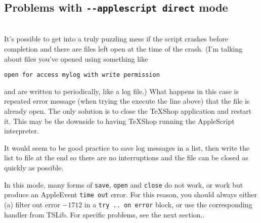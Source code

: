 \documentclass[11pt]{amsart}
\begin{document}
\subsection{Problems with {\tt -{}-applescript direct} mode}\hspace*{1pt}\\[6pt]
It's possible to get into a truly puzzling mess if the script crashes before completion and there are files left open at the time of the crash. (I'm talking about files you've opened using something like
\begin{verbatim}
open for access mylog with write permission
\end{verbatim}
and are written to periodically, like a log file.) What happens in this case is repeated error message (when trying the execute the line above) that the file is already open. The only solution is to close the TeXShop application and restart it. This may be the downside to having TeXShop running the AppleScript interpreter. 

It would seem to be good practice to save log messages in a list, then write the list to file at the end so there are no interruptions and the file can be closed as quickly as possible.

In this mode, many forms of {\tt save}, {\tt open} and {\tt close} do not work, or work but produce an AppleEvent {\tt time out} error. For this reason, you should always either (a) filter out error $-1712$ in a {\tt try .. on error} block, or use the corresponding handler from \textsf{TSLib}.  For specific problems, see the next section.. \\[3pt]
\end{document}
